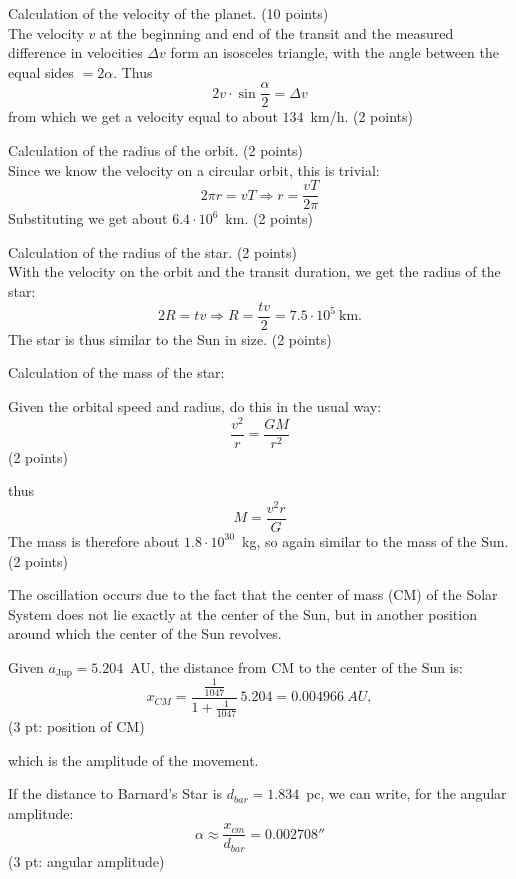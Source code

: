 Calculation of the velocity of the planet. \hfill(10 points)\\
The velocity $v$ at the beginning and end of the transit and the measured
difference in velocities $\Delta v$ form an isosceles triangle, with the angle
between the equal sides $= 2\alpha$. Thus
\[ 2v\cdot\sin\frac{\alpha}{2} = \Delta v \]
from which we get a velocity equal to about $134$~km/h.
\hfill(2 points)

Calculation of the radius of the orbit. \hfill(2 points)\\
Since we know the velocity on a circular orbit, this is trivial:
\[ 2\pi r = vT \Rightarrow r = \frac{vT}{2\pi} \]
Substituting we get about $6.4\cdot10^{6}$~km. \hfill(2 points)

Calculation of the radius of the star. \hfill(2 points)\\
With the velocity on the orbit and the transit duration, we get the radius of
the star:
\[ 2R = tv \Rightarrow R = \frac{tv}{2} = 7.5\cdot10^{5}\ \mathrm{km}. \]
The star is thus similar to the Sun in size. \hfill(2 points)

Calculation of the mass of the %
star:

Given the orbital speed and radius, do this in the usual way:
\[ \frac{v^2}{r} = \frac{GM}{r^2} \]
\hfill(2 points)

thus
\[ M = \frac{v^2 r}{G} \]
The mass is therefore about $1.8\cdot10^{30}$~kg, so again similar to the
mass of the Sun. \hfill(2 points)

The oscillation occurs due to the fact that the center of mass (CM) of the
Solar System does not lie
exactly at the center of the Sun, but in another position around which the
center of the Sun revolves.

Given $a_{\mathrm{Jup}} = 5.204$~AU, the distance from CM to the center of the Sun
is:
\[ x_{CM} = \frac{\frac{1}{1047}}{1+\frac{1}{1047}}\,5.204 = 0.004966\ AU, \]
\hfill(3 pt: position of CM)

which is %
the amplitude of the movement.

If the distance to Barnard's Star is $d_{bar} = 1.834$~pc, we can write, for
the angular amplitude:
\[ \alpha \approx \frac{x_{cm}}{d_{bar}} = 0.002708'' \]
\hfill(3 pt: angular amplitude)


